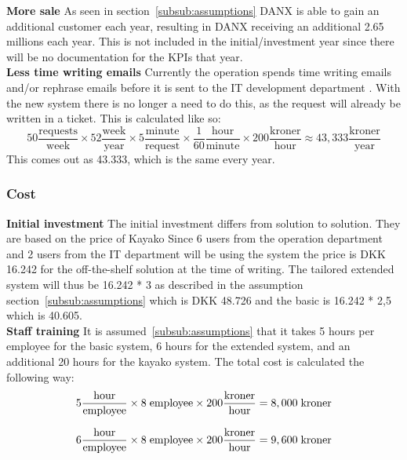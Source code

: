 \textbf{More sale}
As seen in section~\ref{subsub:assumptions} DANX is able to gain an additional customer each year, resulting in DANX receiving an additional 2.65 millions each year. This is not included in the initial/investment year since there will be no documentation for the KPIs that year. \\

\textbf{Less time writing emails}
Currently the operation spends time writing emails and/or rephrase emails before it is sent to the IT development department \cite{gert006} \cite{lasse003}. With the new system there is no longer a need to do this, as the request will already be written in a ticket. This is calculated like so:
\[ 50 \frac{\mathrm{requests}}{\mathrm{week}} \times 52 \frac{\mathrm{week}}{\mathrm{year}} \times 5\frac{\mathrm{minute}}{\mathrm{request}} \times \frac{1}{60} \frac{\mathrm{hour}}{\mathrm{minute}} \times 200\frac{\mathrm{kroner}}{\mathrm{hour}} \approx 43,333 \frac{\mathrm{kroner}}{\mathrm{year}} \]
This comes out as 43.333, which is the same every year.

\subsubsection{Cost}
\textbf{Initial investment}
The initial investment differs from solution to solution. They are based on the price of Kayako\cite{webpage008} Since 6 users from the operation\cite{gert014} department and 2 users from the IT department\cite{lahib003} will be using the system the price is DKK 16.242 for the off-the-shelf solution at the time of writing. The tailored extended system will thus be 16.242 * 3 as described in the assumption section~\ref{subsub:assumptions} which is DKK 48.726 and the basic is 16.242 * 2,5 which is 40.605.\\

\textbf{Staff training}
It is assumed~\ref{subsub:assumptions} that it takes 5 hours per employee for the basic system, 6 hours for the extended system, and an additional 20 hours for the kayako system. The total cost is calculated the following way:
\[ 5 \frac{\mathrm{hour}}{\mathrm{employee}} \times 8 \hspace{1mm} \mathrm{employee} \times 200 \frac{\mathrm{kroner}}{\mathrm{hour}} = 8,000 \hspace{1mm} \mathrm{kroner} \]

\[ 6 \frac{\mathrm{hour}}{\mathrm{employee}} \times 8 \hspace{1mm} \mathrm{employee} \times 200 \frac{\mathrm{kroner}}{\mathrm{hour}} = 9,600 \hspace{1mm} \mathrm{kroner} \]

